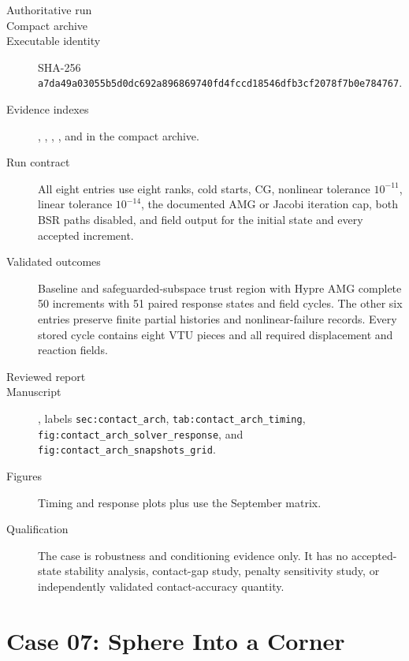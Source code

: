 \documentclass[11pt]{article}
\newcommand{\sha}[2]{\texttt{#1}\allowbreak\texttt{#2}}
\begin{document}
\begin{description}
  \item[Authoritative run] 
  \item[Compact archive] 
  \item[Executable identity] SHA-256 \sha{a7da49a03055b5d0dc692a896869740f}{d4fccd18546dfb3cf2078f7b0e784767}.
  \item[Evidence indexes] , , , , and  in the compact archive.
  \item[Run contract] All eight entries use eight ranks, cold starts, CG, nonlinear tolerance $10^{-11}$, linear tolerance $10^{-14}$, the documented AMG or Jacobi iteration cap, both BSR paths disabled, and field output for the initial state and every accepted increment.
  \item[Validated outcomes] Baseline and safeguarded-subspace trust region with Hypre AMG complete 50 increments with 51 paired response states and field cycles.  The other six entries preserve finite partial histories and nonlinear-failure records.  Every stored cycle contains eight VTU pieces and all required displacement and reaction fields.
  \item[Reviewed report] 
  \item[Manuscript] , labels \texttt{sec:contact\_arch}, \texttt{tab:contact\_arch\_timing}, \texttt{fig:contact\_arch\_solver\_response}, and \texttt{fig:contact\_arch\_snapshots\_grid}.
  \item[Figures] Timing and response plots plus  use the September matrix.
  \item[Qualification] The case is robustness and conditioning evidence only.  It has no accepted-state stability analysis, contact-gap study, penalty sensitivity study, or independently validated contact-accuracy quantity.
\end{description}

\section*{Case 07: Sphere Into a Corner}
\end{document}
